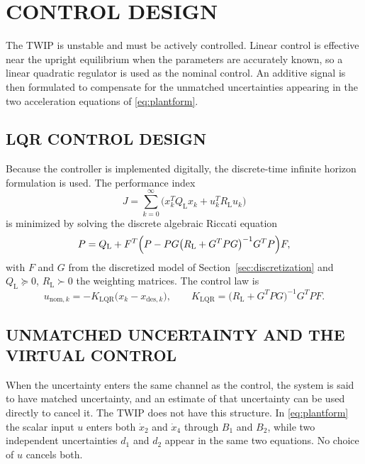 \chapter{CONTROL DESIGN}
\label{ch:control}

The TWIP is unstable and must be actively controlled. Linear control is
effective near the upright equilibrium when the parameters are accurately known,
so a linear quadratic regulator is used as the nominal control. An additive
signal is then formulated to compensate for the unmatched uncertainties
appearing in the two acceleration equations of \eqref{eq:plantform}.

\section{LQR CONTROL DESIGN}
\label{sec:lqr}

Because the controller is implemented digitally, the discrete-time infinite
horizon formulation is used. The performance index
\begin{equation}\label{eq:lqrJ}
J=\sum_{k=0}^{\infty}\bigl(x_k^TQ_{\mathrm{L}}x_k+u_k^TR_{\mathrm{L}}u_k\bigr)
\end{equation}
is minimized by solving the discrete algebraic Riccati equation
\cite{simon2006optimal}
\begin{equation}\label{eq:dare}
P=Q_{\mathrm{L}}+F^T\Bigl(P-PG\bigl(R_{\mathrm{L}}+G^TPG\bigr)^{-1}G^TP\Bigr)F,
\end{equation}
with $F$ and $G$ from the discretized model of Section~\ref{sec:discretization}
and $Q_{\mathrm{L}}\succeq0$, $R_{\mathrm{L}}\succ0$ the weighting matrices.
The control law is
\begin{equation}\label{eq:lqrlaw}
u_{\mathrm{nom},k}=-K_{\mathrm{LQR}}\bigl(x_k-x_{\mathrm{des},k}\bigr),
\qquad
K_{\mathrm{LQR}}=\bigl(R_{\mathrm{L}}+G^TPG\bigr)^{-1}G^TPF .
\end{equation}

\section{UNMATCHED UNCERTAINTY AND THE VIRTUAL CONTROL}

When the uncertainty enters the same channel as the control, the system is said
to have matched uncertainty, and an estimate of that uncertainty can be used
directly to cancel it. The TWIP does not have this structure. In
\eqref{eq:plantform} the scalar input $u$ enters both $\dot x_2$ and $\dot x_4$
through $B_1$ and $B_2$, while two independent uncertainties $d_1$ and $d_2$
appear in the same two equations. No choice of $u$ cancels both.

